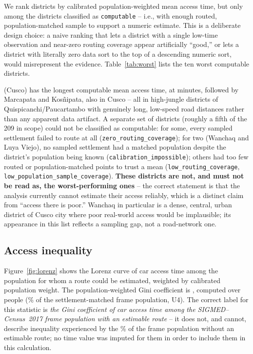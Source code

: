 We rank districts by calibrated population-weighted mean access time, but only among the \NWorstComputable{} districts classified as \texttt{computable} -- i.e., with enough routed, population-matched sample to support a numeric estimate. This is a deliberate design choice: a naive ranking that lets a district with a single low-time observation and near-zero routing coverage appear artificially ``good,'' or lets a district with literally zero data sort to the top of a descending numeric sort, would misrepresent the evidence. Table~\ref{tab:worst} lists the ten worst computable districts.

\begin{table}[htb]
\centering
\caption{Ten worst computable districts by population-weighted mean car access time.}
\label{tab:worst}
\small

\end{table}

\TopOneDistrict{} (Cusco) has the longest computable mean access time, at \TopOneTime{} minutes, followed by Marcapata and Kosñipata, also in Cusco -- all in high-jungle districts of Quispicanchi/Paucartambo with genuinely long, low-speed road distances rather than any apparent data artifact. A separate set of \NInsufficientData{} districts (roughly a fifth of the 209 in scope) could not be classified as computable: for some, every sampled settlement failed to route at all (\texttt{zero\_routing\_coverage}); for two (Wanchaq and Luya Viejo), no sampled settlement had a matched population despite the district's population being known (\texttt{calibration\_impossible}); others had too few routed or population-matched points to trust a mean (\texttt{low\_routing\_coverage}, \texttt{low\_population\_sample\_coverage}). \textbf{These districts are not, and must not be read as, the worst-performing ones} -- the correct statement is that the analysis currently cannot estimate their access reliably, which is a distinct claim from ``access there is poor.'' Wanchaq in particular is a dense, central, urban district of Cusco city where poor real-world access would be implausible; its appearance in this list reflects a sampling gap, not a road-network one.

\subsection{Access inequality}

Figure~\ref{fig:lorenz} shows the Lorenz curve of car access time among the population for whom a route could be estimated, weighted by calibrated population weight. The population-weighted Gini coefficient is \GiniCalibrated{}, computed over \GiniPopIncluded{} people (\GiniPctOfUFour\% of the settlement-matched frame population, U4). The correct label for this statistic is \emph{the Gini coefficient of car access time among the SIGMED--Census~2017 frame population with an estimable route} -- it does not, and cannot, describe inequality experienced by the \GiniPctExcluded\% of the frame population without an estimable route; no time value was imputed for them in order to include them in this calculation.

